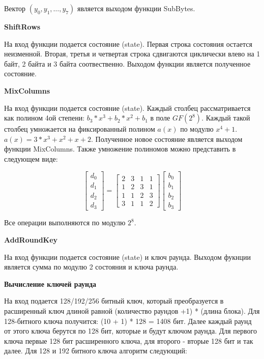 \documentclass[colorthm]{./civarticle}
\begin{document}
Вектор $(y_0, y_1, \dots, y_7)$ является выходом функции SubBytes.

\textbf{ShiftRows}

На вход функции подается состояние (state). Первая строка состояния остается неизменной. Вторая, третья и четвертая строка сдвигаются циклически влево на 1 байт, 2 байта и 3 байта соотвественно. Выходом функции является полученное \textquotedbl состояние.

\textbf{MixColumns}

На вход функции подается состояние (state). Каждый столбец рассматривается как полином 4ой степени: $b_3*x^3+b_2*x^2+b_1$ в поле $GF(2^8)$. Каждый такой столбец умножается на фиксированный полином $a(x)$ по модулю $x^4+1$. $a(x) = 3*x^3+x^2+x+2$. Полученное новое состояние является выходом функции MixColumns. Также умножение полиномов можно представить в следующем виде:

\begin{equation}
    \left[\begin{array}{l}
d_0 \\
d_1 \\
d_2 \\
d_3
\end{array}\right]=\left[\begin{array}{llll}
2 & 3 & 1 & 1 \\
1 & 2 & 3 & 1 \\
1 & 1 & 2 & 3 \\
3 & 1 & 1 & 2
\end{array}\right]\left[\begin{array}{l}
b_0 \\
b_1 \\
b_2 \\
b_3
\end{array}\right]
\end{equation}

Все операции выполняются по модулю $2^8$.

\textbf{AddRoundKey}

На вход функции подается состояние (state) и ключ раунда. Выходом фукнции является сумма по модулю 2 состояния и ключа раунда.

\textbf{Вычисление ключей раунда}

На вход подается 128/192/256 битный ключ, который преобразуется в расширенный ключ длиной равной (количество раундов +1) * (длина блока). Для 128-битного ключа получится: (10 + 1) * 128 = 1408 бит. Далее каждый раунд от этого ключа берутся по 128 бит, которые и будут ключом раунда. Для первого ключа первые 128 бит расширенного ключа, для второго - вторые 128 бит и так далее. Для 128 и 192 битного ключа алгоритм следующий:
\end{document}
